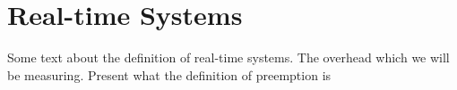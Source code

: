 \chapter{Real-time Systems}
Some text about the definition of real-time systems.
The overhead which we will be measuring.
Present what the definition of preemption is